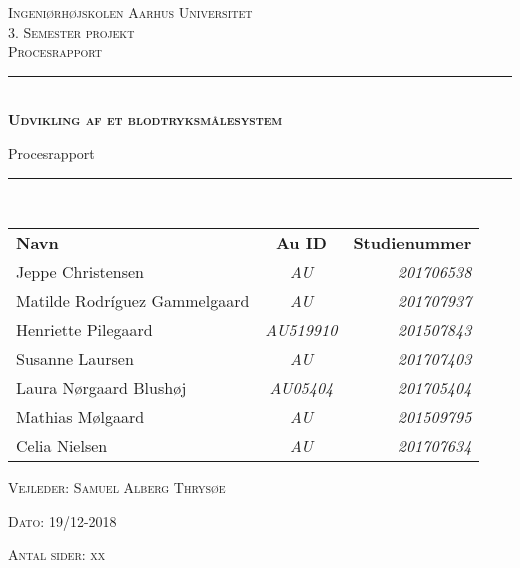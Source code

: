 \thispagestyle{empty}
\newcommand{\HRule}{\rule{\linewidth}{0.1mm}} %

\begin{center}
	\vspace{3cm}
	\textsc{\LARGE Ingeniørhøjskolen Aarhus Universitet}\\[1.5cm] %
	
	\textsc{\large 3. Semester projekt \\Procesrapport}\\[2.5cm] 
	
	\HRule \\[0.8cm]
	{\huge \bfseries \textsc{Udvikling af et
			blodtryksmålesystem}} 

	{\LARGE Procesrapport} \\[0.4cm]
	\HRule \\[1.5cm]
	

	
	
	\vspace{0.5 in}
	\begin{center}
		\begin{tabular}{l c r}
			\textbf{Navn} & \textbf{Au ID} & \textbf{Studienummer} \\
			Jeppe Christensen & \textsl{AU} & \textsl{201706538}  \\
			Matilde Rodríguez Gammelgaard & \textsl{AU} & \textsl{201707937}  \\
			Henriette Pilegaard & \textsl{AU519910} & \textsl{201507843}  \\
			Susanne Laursen & \textsl{AU} & \textsl{201707403}    \\
			Laura Nørgaard Blushøj & \textsl{AU05404} & \textsl{201705404}    \\
			Mathias Mølgaard & \textsl{AU} & \textsl{201509795}    \\
			Celia Nielsen & \textsl{AU} & \textsl{201707634}    \\
			
			
		\end{tabular}
	\end{center}
	\vspace{0.5 in}
	
	\textsc{\large Vejleder: Samuel Alberg Thrysøe}
	\vspace{0.5 in}
	
	\textsc{\large Dato: 19/12-2018}\\
	\vspace{0.5 in}
	

\textsc{Antal sider: xx} \\
\vfill %
	
\end{center} %

\clearpage
